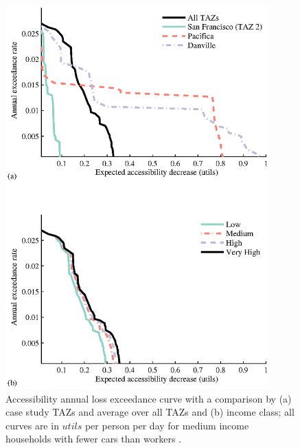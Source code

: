 \begin{figure}
\centering
\includegraphics[width=4in]{FIGS/equity_acc_loss_curves.eps} 
\caption{Accessibility annual loss exceedance curve with a comparison by (a) case study TAZs and average over all TAZs and (b) income class; all curves are in $utils$ per person per day for medium income households with fewer cars than workers .}
\label{fig:acc_by_TAZ_and_income}
\end{figure}
